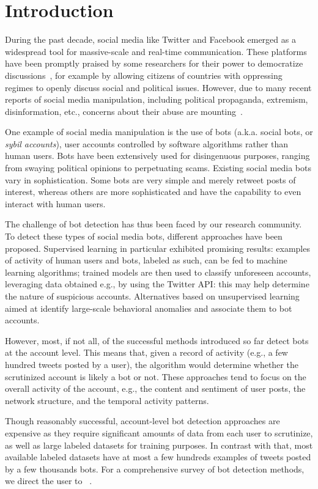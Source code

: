 
\section{Introduction}

During the past decade, social media like Twitter and Facebook emerged as a widespread tool for massive-scale and real-time communication. These platforms have been promptly praised by some researchers for their power to democratize discussions~\cite{loader2011networking}, for example by allowing citizens of countries with oppressing regimes to openly discuss social and political issues.
However, due to many recent reports of social media manipulation, including political propaganda, extremism, disinformation, etc., concerns about their abuse are mounting~\cite{gayo2017social}. 

One example of social media manipulation is the use of bots (a.k.a. social bots, or \textit{sybil accounts}), user accounts controlled by software algorithms rather than human users.
Bots have been extensively used for disingenuous purposes, ranging from swaying political opinions to perpetuating scams. Existing social media bots vary in sophistication. Some bots are very simple and merely retweet posts of interest, whereas others are more sophisticated and have the capability to even interact with human users. 

The challenge of bot detection has thus been faced by our research community. To detect these types of social media bots, different approaches have been proposed. Supervised learning in particular exhibited promising results: examples of activity of human users and bots, labeled as such, can be fed to machine learning algorithms; trained models are then used to classify unforeseen accounts, leveraging data obtained e.g., by using the Twitter API: this may help determine the nature of suspicious accounts. Alternatives based on unsupervised learning aimed at identify large-scale behavioral anomalies and associate them to bot accounts.

However, most, if not all, of the successful methods introduced so far detect bots at the account level. This means that, given a record of activity (e.g., a few hundred tweets posted by a user), the algorithm would determine whether the scrutinized account is likely a bot or not. These approaches tend to focus on the overall activity of the account, e.g., the content and sentiment of user posts, the network structure, and the temporal activity patterns. 

Though reasonably successful, account-level bot detection approaches are expensive as they require significant amounts of data from each user to scrutinize, as well as large labeled datasets for training purposes. In contrast with that, most available labeled datasets have at most a few hundreds examples of tweets posted by a few thousands bots. For a comprehensive survey of bot detection methods, we direct the user to ~\cite{ferrara2016rise}.


